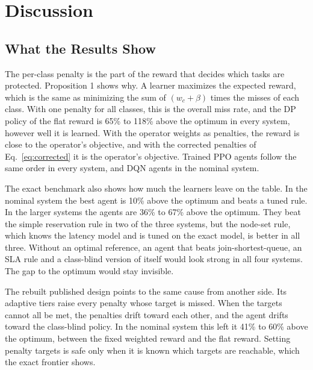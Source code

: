 \section{Discussion}
\label{sec:discussion}

\subsection{What the Results Show}
The per-class penalty is the part of the reward that decides which tasks are protected. Proposition 1 shows why. A learner maximizes the expected reward, which is the same as minimizing the sum of $(w_c + \beta)$ times the misses of each class. With one penalty for all classes, this is the overall miss rate, and the DP policy of the flat reward is 65\% to 118\% above the optimum in every system, however well it is learned. With the operator weights as penalties, the reward is close to the operator's objective, and with the corrected penalties of Eq.~\eqref{eq:corrected} it is the operator's objective. Trained PPO agents follow the same order in every system, and DQN agents in the nominal system.

The exact benchmark also shows how much the learners leave on the table. In the nominal system the best agent is 10\% above the optimum and beats a tuned rule. In the larger systems the agents are 36\% to 67\% above the optimum. They beat the simple reservation rule in two of the three systems, but the node-set rule, which knows the latency model and is tuned on the exact model, is better in all three. Without an optimal reference, an agent that beats join-shortest-queue, an SLA rule and a class-blind version of itself would look strong in all four systems. The gap to the optimum would stay invisible.

The rebuilt published design points to the same cause from another side. Its adaptive tiers raise every penalty whose target is missed. When the targets cannot all be met, the penalties drift toward each other, and the agent drifts toward the class-blind policy. In the nominal system this left it 41\% to 60\% above the optimum, between the fixed weighted reward and the flat reward. Setting penalty targets is safe only when it is known which targets are reachable, which the exact frontier shows.


